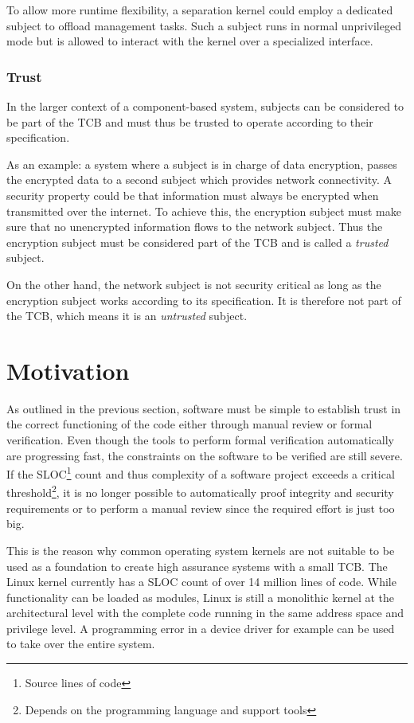 To allow more runtime flexibility, a separation kernel could employ a dedicated
subject to offload management tasks. Such a subject runs in normal unprivileged
mode but is allowed to interact with the kernel over a specialized interface.

\subsubsection{Trust}
In the larger context of a component-based system, subjects can be considered to
be part of the TCB and must thus be trusted to operate according to their
specification.

As an example: a system where a subject is in charge of data encryption, passes
the encrypted data to a second subject which provides network connectivity. A
security property could be that information must always be encrypted when
transmitted over the internet. To achieve this, the encryption subject must make
sure that no unencrypted information flows to the network subject. Thus the
encryption subject must be considered part of the TCB and is called a
\emph{trusted} subject.

On the other hand, the network subject is not security critical as long as the
encryption subject works according to its specification. It is therefore not
part of the TCB, which means it is an \emph{untrusted} subject.

\section{Motivation}
As outlined in the previous section, software must be simple to establish trust
in the correct functioning of the code either through manual review or formal
verification. Even though the tools to perform formal verification
automatically are progressing fast, the constraints on the software to be
verified are still severe. If the SLOC\footnote{Source lines of
code} count and thus complexity of a software project exceeds a
critical threshold\footnote{Depends on the programming language and support
tools}, it is no longer possible to automatically proof integrity and security
requirements or to perform a manual review since the required effort is just
too big.

This is the reason why common operating system kernels are not suitable to be
used as a foundation to create high assurance systems with a small TCB. The
Linux kernel currently has a SLOC count of over 14 million lines
of code. While functionality can be loaded as modules, Linux is still a
monolithic kernel at the architectural level with the complete code running in
the same address space and privilege level. A programming error in a device
driver for example can be used to take over the entire system.

